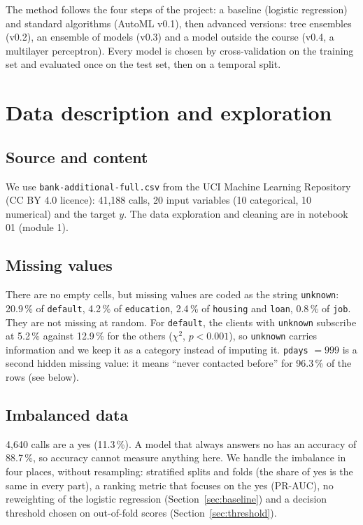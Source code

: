 \documentclass[11pt,a4paper]{article}
\begin{document}
The method follows the four steps of the project: a baseline (logistic regression) and standard algorithms
(AutoML v0.1), then advanced versions: tree ensembles (v0.2), an ensemble of models (v0.3) and a model outside the
course (v0.4, a multilayer perceptron). Every model is chosen by cross-validation on the training set and evaluated
once on the test set, then on a temporal split.

\section{Data description and exploration}

\subsection{Source and content}
We use \texttt{bank-additional-full.csv} from the UCI Machine Learning Repository (CC BY 4.0 licence): 41,188 calls,
20 input variables (10 categorical, 10 numerical) and the target $y$. The data exploration and cleaning are in
notebook 01 (module 1).

\subsection{Missing values}
There are no empty cells, but missing values are coded as the string \texttt{unknown}: 20.9\,\% of \texttt{default}, 4.2\,\% of
\texttt{education}, 2.4\,\% of \texttt{housing} and \texttt{loan}, 0.8\,\% of \texttt{job}. They are not missing at
random. For \texttt{default}, the clients with \texttt{unknown} subscribe at 5.2\,\% against 12.9\,\% for the others
($\chi^2$, $p<0.001$), so \texttt{unknown} carries information and we keep it as a category instead of imputing it.
\texttt{pdays} $=999$ is a second hidden missing value: it means ``never contacted before'' for 96.3\,\% of the rows
(see below).

\subsection{Imbalanced data}\label{sec:imbalance}
4,640 calls are a yes (11.3\,\%). A model that always answers no has an accuracy of 88.7\,\%, so accuracy cannot
measure anything here. We handle the imbalance in four places, without resampling: stratified splits and folds (the
share of yes is the same in every part), a ranking metric that focuses on the yes (PR-AUC), no reweighting of the
logistic regression (Section~\ref{sec:baseline}) and a decision threshold chosen on out-of-fold scores
(Section~\ref{sec:threshold}).
\end{document}
